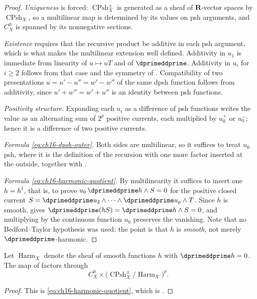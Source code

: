 \begin{proof}
\emph{Uniqueness} is forced: $\operatorname{CPsh}^\pm_X$ is generated as a
sheaf of $\mathbf R$-vector spaces by $\operatorname{CPsh}_X$, so a
multilinear map is determined by its values on psh arguments, and
$C^0_X$ is spanned by its nonnegative sections.

\emph{Existence} requires that the recursive product be additive in each psh
argument, which is what makes the multilinear extension well defined.
Additivity in $u_1$ is immediate from linearity of $u\mapsto uT$ and of
$\dprimeddprime$.  Additivity in $u_i$ for $i\geq2$ follows from that case
and the symmetry of .  Compatibility of two
presentations $u=u'-u''=w'-w''$ of the same dpsh function follows from
additivity, since $u'+w''=w'+u''$ is an identity between psh functions.

\emph{Positivity structure.}  Expanding each $u_i$ as a difference of psh
functions writes the value as an alternating sum of $2^p$ positive currents,
each multiplied by $u_0^+$ or $u_0^-$; hence it is a difference of two
positive currents.

\emph{Formula \eqref{eq:ch16-dpsh-outer}.}  Both sides are multilinear, so it
suffices to treat $u_0$ psh, where it is the definition of the recursion
with one more factor inserted at the outside, together with
.

\emph{Formula \eqref{eq:ch16-harmonic-quotient}.}  By multilinearity it
suffices to insert one $h=h^1$, that is, to prove
$u_0\,\dprimeddprime h\wedge S=0$ for the positive closed current
$S=\dprimeddprime u_2\wedge\cdots\wedge\dprimeddprime u_p\wedge T$.  Since
$h$ is smooth,  gives
$\dprimeddprime(hS)=\dprimeddprime h\wedge S=0$, and multiplying by the
continuous function $u_0$ preserves the vanishing.  Note that no
Bedford--Taylor hypothesis was used: the point is that $h$ is \emph{smooth},
not merely $\dprimeddprime$-harmonic.
\end{proof}

\begin{corollary}
\label{cor:ch16-harmonic-quotient}
Let $\operatorname{Harm}_X$ denote the sheaf of smooth functions $h$ with
$\dprimeddprime h=0$.  The map of  factors
through
\[
 C^0_X\times\bigl(\operatorname{CPsh}^\pm_X/\operatorname{Harm}_X\bigr)^p .
\]
\end{corollary}

\begin{proof}
This is \eqref{eq:ch16-harmonic-quotient}, which is
\cite[\S8.8.5]{CLD25}.
\end{proof}

